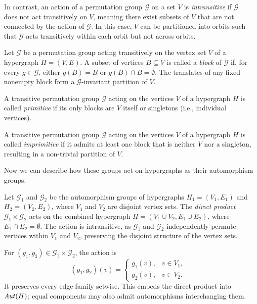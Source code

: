 In contrast, an action of a permutation group $\mathcal{G}$ on a set $V$ is \emph{intransitive} if $\mathcal{G}$ does not act transitively on $V$, meaning there exist subsets of $V$ that are not connected by the action of $\mathcal{G}$. In this case, $V$ can be partitioned into orbits such that $\mathcal{G}$ acts transitively within each orbit but not across orbits.

\begin{definition}
Let $\mathcal{G}$ be a permutation group acting transitively on the vertex set $V$ of a hypergraph $H=(V,E)$. A subset of vertices $B\subseteq V$ is called a \emph{block} of $\mathcal{G}$ if, for every $g\in\mathcal{G}$, either $g(B)=B$ or $g(B)\cap B=\emptyset$. The translates of any fixed nonempty block form a $\mathcal{G}$-invariant partition of $V$.
\end{definition}

\begin{definition}
A transitive permutation group $\mathcal{G}$ acting on the vertices $V$ of a hypergraph $H$ is called \emph{primitive} if its only blocks are $V$ itself or singletons (i.e., individual vertices).
\end{definition}

\begin{definition}
A transitive permutation group $\mathcal{G}$ acting on the vertices $V$ of a hypergraph $H$ is called \emph{imprimitive} if it admits at least one block that is neither $V$ nor a singleton, resulting in a non-trivial partition of $V$.
\end{definition}

Now we can describe how these groups act on hypergraphs as their automorphism groups.

Let $\mathcal{G}_1$ and $\mathcal{G}_2$ be the automorphism groups of hypergraphs $H_1=(V_1,E_1)$ and $H_2=(V_2,E_2)$, where $V_1$ and $V_2$ are disjoint vertex sets. The \emph{direct product} $\mathcal{G}_1\times\mathcal{G}_2$ acts on the combined hypergraph $H=(V_1\cup V_2,E_1\cup E_2)$, where $E_1\cap E_2=\emptyset$. The action is intransitive, as $\mathcal{G}_1$ and $\mathcal{G}_2$ independently permute vertices within $V_1$ and $V_2$, preserving the disjoint structure of the vertex sets.

For $(g_1,g_2)\in\mathcal{G}_1\times\mathcal{G}_2$, the action is
\[
(g_1,g_2)(v)=\begin{cases}g_1(v),&v\in V_1,\\g_2(v),&v\in V_2.\end{cases}
\]
It preserves every edge family setwise. This embeds the direct product into
$\mathit{Aut}(H)$; equal components may also admit automorphisms interchanging them.

